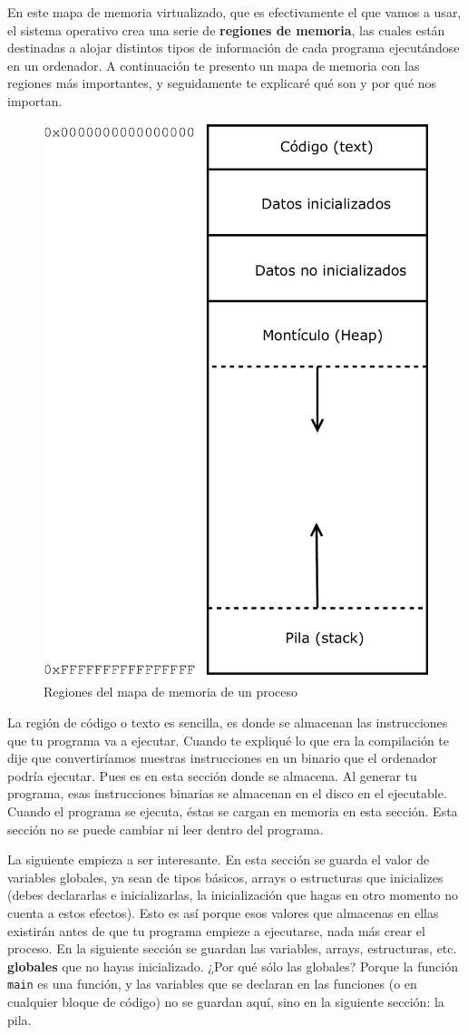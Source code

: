 \documentclass[a4paper]{article}
\begin{document}
En este mapa de memoria virtualizado, que es efectivamente el que vamos a usar,
el sistema operativo crea una serie de \textbf{regiones de memoria}, las cuales
están destinadas a alojar distintos tipos de información de cada programa
ejecutándose en un ordenador. A continuación te presento un mapa de memoria
con las regiones más importantes, y seguidamente te explicaré qué son y por qué
nos importan.
\begin{figure}[H]
    \center
    \includegraphics[width=0.5\linewidth]{regionsMemoryMap}
    \caption{Regiones del mapa de memoria de un proceso}
    \label{img:regionsMemoryMap}
\end{figure}

La región de código o texto es sencilla, es donde se almacenan las
instrucciones que tu programa va a ejecutar. Cuando te expliqué lo que era la
compilación te dije que convertiríamos nuestras instrucciones en un binario que
el ordenador podría ejecutar. Pues es en esta sección donde se almacena. Al
generar tu programa, esas instrucciones binarias se almacenan en el disco en
el ejecutable. Cuando el programa se ejecuta, éstas se cargan en memoria en
esta sección. Esta sección no se puede cambiar ni leer dentro del programa.

La siguiente empieza a ser interesante. En esta sección se guarda el valor de
variables globales, ya sean de tipos básicos, arrays o estructuras que
inicializes (debes declararlas e inicializarlas, la inicialización que hagas en
otro momento no cuenta a estos efectos). Esto es así porque esos valores que
almacenas en ellas existirán
antes de que tu programa empieze a ejecutarse, nada más crear el proceso.
En la siguiente sección se guardan las
variables, arrays, estructuras, etc. \textbf{globales} que no hayas
inicializado. ¿Por qué sólo las globales? Porque la función \verb!main! es una
función, y las variables que se declaran en las funciones
(o en cualquier bloque de código) no se guardan aquí, sino en la siguiente
sección: la pila.
\end{document}
